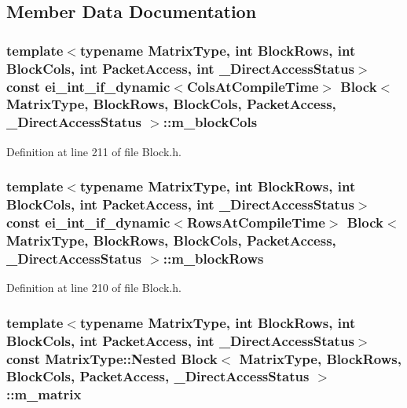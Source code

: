\subsection{Member Data Documentation}
\hypertarget{class_block_ac098f4da0b6a27c85908361eb7cdb256}{
\subsubsection[{m\-\_\-block\-Cols}]{\setlength{\rightskip}{0pt plus 5cm}template$<$typename Matrix\-Type, int Block\-Rows, int Block\-Cols, int Packet\-Access, int \-\_\-\-Direct\-Access\-Status$>$ const ei\-\_\-int\-\_\-if\-\_\-dynamic$<${\bf Cols\-At\-Compile\-Time}$>$ {\bf Block}$<$ Matrix\-Type, Block\-Rows, Block\-Cols, Packet\-Access, \-\_\-\-Direct\-Access\-Status $>$\-::m\-\_\-block\-Cols\hspace{0.3cm}{\ttfamily [protected]}}}\label{class_block_ac098f4da0b6a27c85908361eb7cdb256}


Definition at line 211 of file Block.\-h.

\hypertarget{class_block_a7a337b29f56a0984c9f8a190092e6942}{
\subsubsection[{m\-\_\-block\-Rows}]{\setlength{\rightskip}{0pt plus 5cm}template$<$typename Matrix\-Type, int Block\-Rows, int Block\-Cols, int Packet\-Access, int \-\_\-\-Direct\-Access\-Status$>$ const ei\-\_\-int\-\_\-if\-\_\-dynamic$<${\bf Rows\-At\-Compile\-Time}$>$ {\bf Block}$<$ Matrix\-Type, Block\-Rows, Block\-Cols, Packet\-Access, \-\_\-\-Direct\-Access\-Status $>$\-::m\-\_\-block\-Rows\hspace{0.3cm}{\ttfamily [protected]}}}\label{class_block_a7a337b29f56a0984c9f8a190092e6942}


Definition at line 210 of file Block.\-h.

\hypertarget{class_block_ac527318db350afd3af368ba80b1ba3eb}{
\subsubsection[{m\-\_\-matrix}]{\setlength{\rightskip}{0pt plus 5cm}template$<$typename Matrix\-Type, int Block\-Rows, int Block\-Cols, int Packet\-Access, int \-\_\-\-Direct\-Access\-Status$>$ const Matrix\-Type\-::\-Nested {\bf Block}$<$ Matrix\-Type, Block\-Rows, Block\-Cols, Packet\-Access, \-\_\-\-Direct\-Access\-Status $>$\-::m\-\_\-matrix\hspace{0.3cm}{\ttfamily [protected]}}}\label{class_block_ac527318db350afd3af368ba80b1ba3eb}


